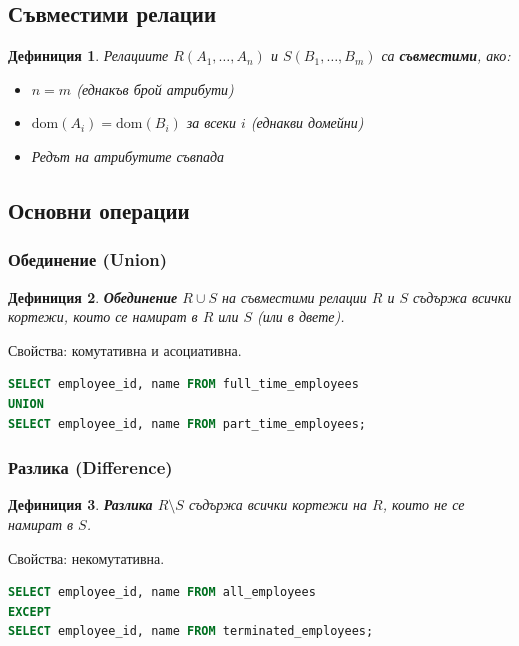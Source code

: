 \documentclass{scrartcl}
\newtheorem{definition}{Дефиниция}
\begin{document}
\begin{FlushLeft}
\subsection{Съвместими релации}

\begin{definition}
Релациите $R(A_1, \ldots, A_n)$ и $S(B_1, \ldots, B_m)$ са \textbf{\textit{съвместими}}, ако:
\begin{itemize}
    \item $n = m$ (еднакъв брой атрибути)
    \item $\text{dom}(A_i) = \text{dom}(B_i)$ за всеки $i$ (еднакви домейни)
    \item Редът на атрибутите съвпада
\end{itemize}
\end{definition}

\subsection{Основни операции}

\subsubsection{Обединение (Union)}

\begin{definition}
\textbf{\textit{Обединение}} $R \cup S$ на съвместими релации $R$ и $S$ съдържа всички кортежи, които се намират в $R$ или $S$ (или в двете).
\end{definition}

Свойства: комутативна и асоциативна.

\begin{lstlisting}[language=SQL, caption=UNION]
SELECT employee_id, name FROM full_time_employees
UNION
SELECT employee_id, name FROM part_time_employees;
\end{lstlisting}

\subsubsection{Разлика (Difference)}

\begin{definition}
\textbf{\textit{Разлика}} $R \setminus S$ съдържа всички кортежи на $R$, които не се намират в $S$.
\end{definition}

Свойства: некомутативна.

\begin{lstlisting}[language=SQL, caption=EXCEPT or MINUS]
SELECT employee_id, name FROM all_employees
EXCEPT
SELECT employee_id, name FROM terminated_employees;
\end{lstlisting}


\end{FlushLeft}
\end{document}
